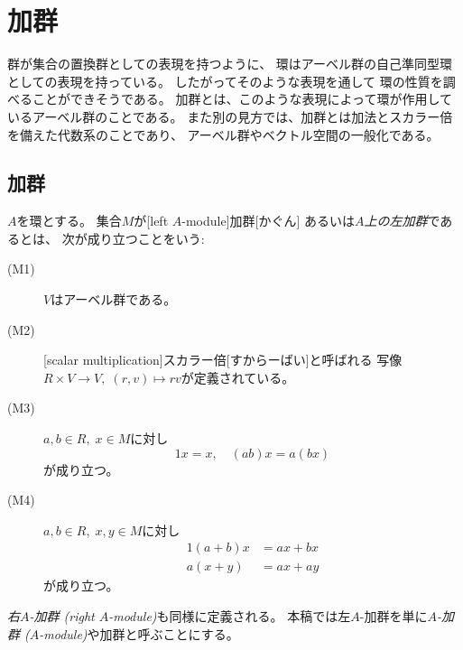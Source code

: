 \documentclass[report]{jlreq}
\begin{document}
%
\chapter{加群}

群が集合の置換群としての表現を持つように、
環はアーベル群の自己準同型環としての表現を持っている。
したがってそのような表現を通して
環の性質を調べることができそうである。
加群とは、このような表現によって環が作用しているアーベル群のことである。
また別の見方では、加群とは加法とスカラー倍を備えた代数系のことであり、
アーベル群やベクトル空間の一般化である。

%
\section{加群}

\begin{definition}[加群]
    $A$を環とする。
    集合$M$が[left $A$-module]{加群}[かぐん]
    あるいは\emph{$A$上の左加群}であるとは、
    次が成り立つことをいう:
    \begin{description}
        \item[(M1)] $V$はアーベル群である。
        \item[(M2)]
            [scalar multiplication]{スカラー倍}[すからーばい]と呼ばれる
            写像$R \times V \to V, \; (r, v) \mapsto rv$が定義されている。
        \item[(M3)] $a, b \in R, \; x \in M$に対し
            \begin{equation}
                1x = x, \quad (ab) x = a (bx)
            \end{equation}
            が成り立つ。
        \item[(M4)] $a, b \in R, \; x, y \in M$に対し
            \begin{alignat}{1}
                (a + b) x &= ax + bx \\
                a (x + y) &= ax + ay
            \end{alignat}
            が成り立つ。
    \end{description}
    \emph{右$A$-加群 (right $A$-module)}も同様に定義される。
    本稿では左$A$-加群を単に\emph{$A$-加群 ($A$-module)}や加群と呼ぶことにする。
\end{definition}
\end{document}
